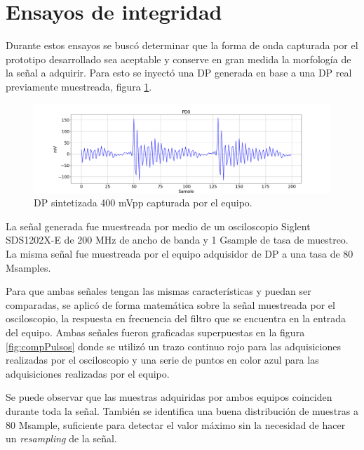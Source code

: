\vspace{5mm}

\section{Ensayos de integridad}


Durante estos ensayos se buscó determinar que la forma de onda capturada por el prototipo desarrollado sea aceptable y conserve en gran medida la morfología de la señal a adquirir. Para esto se inyectó una DP generada en base a una DP real previamente muestreada, figura \ref{fig:dpSint}.

\begin{figure}[htpb]
	\hspace{-1.2cm}
	\includegraphics[width=165mm]{./Figures/dpSint.png}
	\caption{DP sintetizada 400 mVpp capturada por el equipo.}
	\label{fig:dpSint}
\end{figure}

\vspace{5mm}

La señal generada fue muestreada por medio de un osciloscopio Siglent SDS1202X-E de 200 MHz de ancho de banda y 1 Gsample de tasa de muestreo. La misma señal fue muestreada por el equipo adquisidor de DP a una tasa de 80 Msamples. 

Para que ambas señales tengan las mismas características y puedan ser comparadas, se aplicó de forma matemática sobre la señal muestreada por el osciloscopio, la respuesta en frecuencia del filtro que se encuentra en la entrada del equipo. Ambas señales fueron graficadas superpuestas en la figura \ref{fig:compPulsos} donde se utilizó un trazo continuo rojo para las adquisiciones realizadas por el osciloscopio y una serie de puntos en color azul para las adquisiciones realizadas por el equipo.

Se puede observar que las muestras adquiridas por ambos equipos coinciden durante toda la señal. También se identifica una buena distribución de muestras a 80 Msample, suficiente para detectar el valor máximo sin la necesidad de hacer un \textit{resampling} de la señal.

